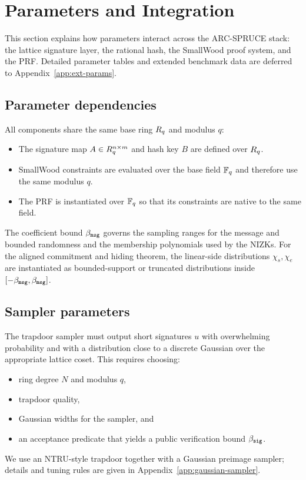 \section{Parameters and Integration}
\label{sec:parameters}

This section explains how parameters interact across the ARC-SPRUCE stack: the lattice signature layer, the rational
hash, the SmallWood proof system, and the PRF. Detailed parameter tables and extended benchmark data are deferred to
Appendix~\ref{app:ext-params}.

\subsection{Parameter dependencies}
All components share the same base ring \(R_q\) and modulus \(q\):
\begin{itemize}[leftmargin=1.25em]
  \item The signature map \(A\in R_q^{n\times m}\) and hash key \(B\) are defined over \(R_q\).
  \item SmallWood constraints are evaluated over the base field \(\mathbb{F}_q\) and therefore use the same modulus \(q\).
  \item The PRF is instantiated over \(\mathbb{F}_q\) so that its constraints are native to the same field.
\end{itemize}
The coefficient bound \(\beta_{\mathtt{msg}}\) governs the sampling ranges for the message and bounded randomness and the
membership polynomials used by the NIZKs. For the aligned commitment and hiding theorem, the linear-side distributions
\(\chi_s,\chi_e\) are instantiated as bounded-support or truncated distributions inside
\([-\beta_{\mathtt{msg}},\beta_{\mathtt{msg}}]\).

\subsection{Sampler parameters}
The trapdoor sampler must output short signatures \(u\) with overwhelming probability and with a distribution close to
a discrete Gaussian over the appropriate lattice coset. This requires choosing:
\begin{itemize}[leftmargin=1.25em]
  \item ring degree \(N\) and modulus \(q\),
  \item trapdoor quality,
  \item Gaussian widths for the sampler, and
  \item an acceptance predicate that yields a public verification bound \(\beta_{\mathtt{sig}}\).
\end{itemize}
We use an NTRU-style trapdoor together with a Gaussian preimage sampler; details and tuning rules are given in
Appendix~\ref{app:gaussian-sampler}.

